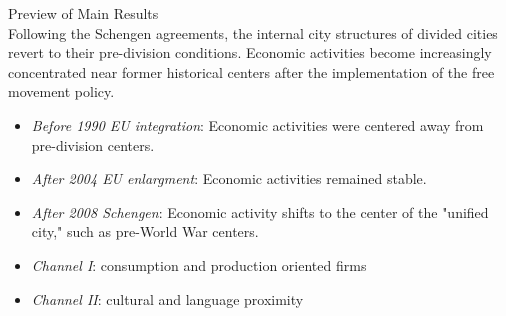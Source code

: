 \documentclass[]{beamer}
\begin{document}
\begin{frame}{Preview of Main Results}
\\\textbf{} 
Following the Schengen agreements, the internal city structures of divided cities revert to their pre-division conditions. Economic activities become increasingly concentrated near former historical centers after the implementation of the free movement policy.
\vspace{0.2cm}
\justifying
\vspace{0.2cm}
\begin{itemize}
    \item \textit{Before 1990 EU integration}: Economic activities were centered away from pre-division centers. 
    \item \textit{After 2004 EU enlargment}: Economic activities remained stable.
    \item \textit{After 2008 Schengen}: Economic activity shifts to the center of the "unified city," such as pre-World War centers.
    \vspace{0.5cm}
    \item \textit{Channel I}: consumption and production oriented firms 
    \item \textit{Channel II}: cultural and language proximity 
\end{itemize}
\end{frame}
\end{document}
